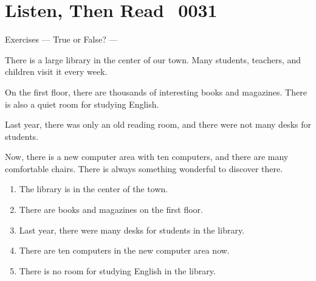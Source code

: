 \documentclass[aspectratio=169,xcolor={dvipsnames,table}]{beamer}
\newcommand{\myaudio}[1]{\href{#1}{\faVolumeUp}}
\begin{document}
\section{Listen, Then Read\,\,\,\,\,{\tiny 0031}\,{\scriptsize \myaudio{./audio/001_there_is_reading.mp3}}}
\begin{frame}[plain,t]{Exercises --- True or False? ---}
\vspace*{-8pt}
\begin{spacing}{1.1}
\begin{tcolorbox}[colframe=ForestGreen,
  colback=NavyBlue!10!white,
  colbacktitle=NavyBlue!40!white,
  coltitle=black, %
before upper={\setlength{\parindent}{1.25em}},
 title={A Visit to the City Library\hfill{\tiny 0031}\quad{\scriptsize \myaudio{./audio/001_there_is_reading.mp3}}}
]
\vspace*{-4pt}
\noindent{}There is a large library in the center of our town. Many students, teachers, and children visit it every week.

On the first floor, there are thousands of interesting books and magazines. There is also a quiet room for studying English.

Last year, there was only an old reading room, and there were not many desks for students.

Now, there is a new computer area with ten computers, and there are many comfortable chairs. There is always something wonderful to discover there.
\end{tcolorbox}
\end{spacing}

\vspace{-7pt}
\begin{enumerate}\setlength{\itemsep}{-3.5pt}
\item<2-> The library is in the center of the town.\hfill{}
\item<2-> There are books and magazines on the first floor.\hfill{}
\item<2-> Last year, there were many desks for students in the library.\hfill{}
\item<2-> There are ten computers in the new computer area now.\hfill{}
\item<2-> There is no room for studying English in the library.\hfill{}
\end{enumerate}
\end{frame}
\end{document}
